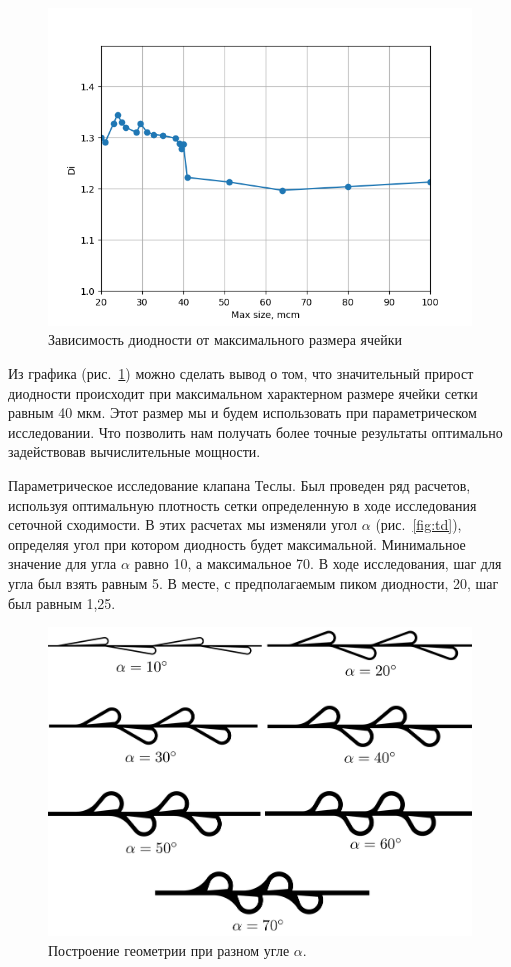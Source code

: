 \documentclass[10pt,a4paper]{book}
\begin{document}
    \begin{figure}[H]
        \centering
        \includegraphics[width = 0.5\linewidth]{graphDiMaxSize}
        \caption{Зависимость диодности от максимального размера ячейки}
        \label{fig:graphDiMaxSize}
    \end{figure}
     
    Из графика (рис.~\ref{fig:graphDiMaxSize}) можно сделать вывод о том, что значительный прирост диодности происходит при максимальном характерном размере ячейки сетки равным 40 мкм. Этот размер мы и будем использовать при параметрическом исследовании. Что позволить нам получать более точные результаты оптимально задействовав вычислительные мощности. 
    
    
    Параметрическое исследование клапана Теслы. Был проведен ряд расчетов, используя оптимальную плотность сетки определенную в ходе исследования сеточной сходимости. В этих расчетах мы изменяли угол $ \alpha $ (рис.~\ref{fig:td}), определяя угол при котором диодность будет максимальной. Минимальное значение для угла $ \alpha $ равно 10\textdegree, а максимальное 70\textdegree. В ходе исследования, шаг для угла был взять равным 5\textdegree. В месте, с предполагаемым пиком диодности, 20\textdegree, шаг был равным 1,25\textdegree. 
    
    \begin{figure}[H]
        \centering
        \includegraphics[width = 1\linewidth]{allAngle1}
        \caption{Построение геометрии при разном угле $\alpha$.}
        \label{fig:allAngle}
    \end{figure}  
          
\end{document}
